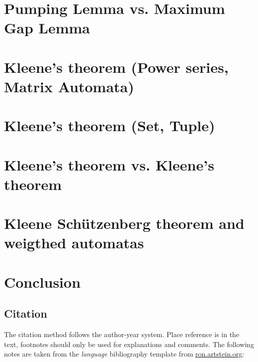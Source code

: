 \documentclass[12pt,letterpaper]{article}
\begin{document}
\section{Pumping Lemma vs. Maximum Gap Lemma}
\section{Kleene's theorem (Power series, Matrix Automata)}
\section{Kleene's theorem (Set, Tuple)}
\section{Kleene's theorem vs. Kleene's theorem}
\section{Kleene Schützenberg theorem and weigthed automatas}
\section{Conclusion}


\subsection{Citation} 
\label{sec:cit}

The citation method follows the author-year system. Place reference is in the text, footnotes should only be used for explanations and comments. The following notes are taken from the \emph{language} bibliography template from \url{ron.artstein.org}:\newline
\end{document}
